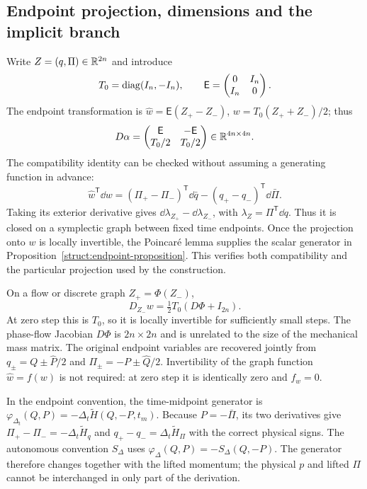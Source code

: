 \subsection{Endpoint projection, dimensions and the implicit branch}
\label{ss:projection}

Write $Z=(q,\Pi)\in\mathbb R^{2n}$ and introduce
\[
 T_0=\operatorname{diag}(I_n,-I_n),\qquad
 \mathsf E=\begin{pmatrix}0&I_n\\I_n&0\end{pmatrix}.
\]
The endpoint transformation is
$\widehat w=\mathsf E(Z_+-Z_-)$,
$w=T_0(Z_++Z_-)/2$; thus
\begin{equation}\label{ss:endpoint-matrix}
 D\alpha=\begin{pmatrix}
 \mathsf E&-\mathsf E\\T_0/2&T_0/2
 \end{pmatrix}\in\mathbb R^{4n\times4n}.
\end{equation}
The compatibility identity can be checked without assuming a generating function in advance:
\[
 \widehat w^{\mathsf T}\dd w
 = (\Pi_+-\Pi_-)^{\mathsf T}\dd\bar q
       -(q_+-q_-)^{\mathsf T}\dd\bar\Pi.
\]
Taking its exterior derivative gives
$\dd\lambda_{Z_+}-\dd\lambda_{Z_-}$, with
$\lambda_Z=\Pi^{\mathsf T}\dd q$.
Thus it is closed on a symplectic graph between fixed time endpoints. Once the projection onto $w$ is locally invertible, the Poincar\'e lemma supplies the scalar generator in Proposition~\ref{struct:endpoint-proposition}. This verifies both compatibility and the particular projection used by the construction.

On a flow or discrete graph $Z_+=\Phi(Z_-)$,
\begin{equation}\label{ss:endpoint-projection}
 D_{Z_-}w=\tfrac12T_0(D\Phi+I_{2n}).
\end{equation}
At zero step this is $T_0$, so it is locally invertible for sufficiently small steps. The phase-flow Jacobian $D\Phi$ is $2n\times2n$ and is unrelated to the size of the mechanical mass matrix. The original endpoint variables are recovered jointly from
$q_\pm=Q\pm\widehat P/2$ and
$\Pi_\pm=-P\pm\widehat Q/2$.
Invertibility of the graph function $\widehat w=f(w)$ is not required: at zero step it is identically zero and $f_w=0$.

In the endpoint convention, the time-midpoint generator is
$\varphi_{\Delta_t}(Q,P)=-\Delta_t\widetilde H(Q,-P,t_m)$.
Because $P=-\bar\Pi$, its two derivatives give
$\Pi_+-\Pi_-=-\Delta_t\widetilde H_q$ and
$q_+-q_-=\Delta_t\widetilde H_\Pi$ with the correct physical signs. The autonomous convention $S_\Delta$ uses
$\varphi_\Delta(Q,P)=-S_\Delta(Q,-P)$.
The generator therefore changes together with the lifted momentum; the physical $p$ and lifted $\Pi$ cannot be interchanged in only part of the derivation.


